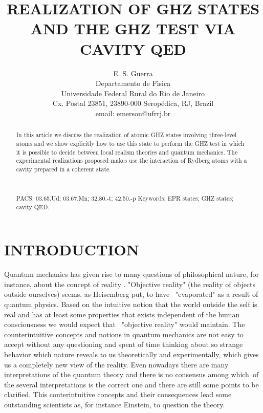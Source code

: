 \documentclass[12pt,thmsa]{article}
\begin{document}
\author{E. S. Guerra \\
Departamento de F\'{\i}sica \\
Universidade Federal Rural do Rio de Janeiro \\
Cx. Postal 23851, 23890-000 Serop\'edica, RJ, Brazil \\
email: emerson@ufrrj.br\\
}
\title{REALIZATION OF GHZ STATES AND THE GHZ TEST VIA CAVITY QED}
\maketitle

\begin{abstract}
\noindent In this article we discuss the realization of atomic GHZ states
involving three-level atoms and we show explicitly how to use this state to
perform the GHZ test in which it is possible to decide between local realism
theories and quantum mechanics. The experimental realizations proposed makes
use the interaction of Rydberg atoms with a cavity prepared in a coherent
state.

\ \newline

PACS: 03.65.Ud; 03.67.Mn; 32.80.-t; 42.50.-p \newline
Keywords: EPR states; GHZ states; cavity QED.
\end{abstract}


\section{INTRODUCTION}

Quantum mechanics has given rise to many questions of philosophical nature,
for instance, about the concept of reality \cite{JammerPhil, Omnes, Hughes,
Krips, Espagnat}. "Objective reality" (the reality of objects outside
ourselves) seems, as Heisemberg put, to have \ "evaporated" as a result of
quantum physics. Based on the intuitive notion that the world outside the
self is real and has at least some properties that exists independent of the
human consciousness we would expect that \ "objective reality" would
maintain. The counterintuitive concepts and notions in quantum mechanics are
not easy to accept without any questioning and spent of time thinking about
so strange behavior which nature reveals to us theoretically and
experimentally, which gives us a completely new view of the reality. Even
nowadays there are many interpretations of the quantum theory \cite%
{JammerPhil, Omnes, Hughes, Krips} and there is no consensus among which\ of
the several interpretations is the correct one and there are still some
points to be clarified. This conterintuitive concepts and their consequences
lead some outstanding scientists as, for instance Einstein, to question the
theory.
\end{document}

